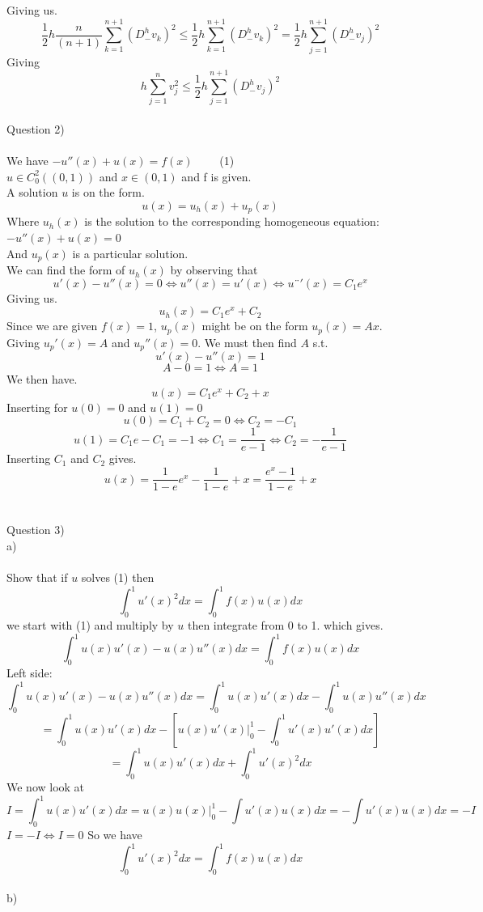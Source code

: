 \documentclass[12pt, letterpaper, twoside]{article}
\begin{document}
Giving us.
$$
\frac{1}{2} h \frac{n}{(n+1)} \sum_{k=1}^{n+1} (D_-^h v_k)^2 
\leq
\frac{1}{2} h  \sum_{k=1}^{n+1} (D_-^h v_k)^2 
=
\frac{1}{2} h  \sum_{j=1}^{n+1} (D_-^h v_j)^2 
$$
Giving
$$
h\sum_{j=1}^n v_j^2 \leq \frac{1}{2} h \sum_{j=1}^{n+1} (D_-^h v_j)^2
$$
\ \\
\newpage
Question 2)\\
\ \\
We have $-u''(x) + u(x) = f(x)$ \ \ \ \ (1) \\
$u \in C_0^2((0,1))$ and $x \in (0,1)$ and f is given.
\ \\
A solution $u$ is on the form.
$$
u(x) = u_h(x) + u_p(x) 
$$
Where $u_h(x)$ is the solution to the corresponding homogeneous equation:
$-u''(x) + u(x) = 0$\\
And $u_p(x)$ is a particular solution.\\
We can find the form of $u_h(x)$ by observing that
$$
u'(x) - u''(x) = 0 \iff u''(x) = u'(x) \iff u¨'(x) = C_1 e^x 
$$
Giving us.
$$
u_h(x) = C_1e^x + C_2
$$
Since we are given $f(x)=1$, $u_p(x)$ might be on the form $u_p(x) = Ax$.\\
Giving $u_p'(x) = A$ and $u_p''(x) = 0$. We must then find $A$ s.t.
$$
u'(x) - u''(x) = 1
$$
$$
A - 0 = 1 \iff A=1
$$
We then have.
$$
u(x) = C_1e^x + C_2 + x 
$$
Inserting for $u(0)= 0$ and $u(1)=0$
$$
u(0) = C_1 + C_2 = 0 \iff C_2 = -C_1
$$
$$
u(1) = C_1e - C_1 = -1 \iff C_1 = \frac{1}{e-1} \iff C_2 = -\frac{1}{e-1}
$$
Inserting $C_1$ and $C_2$ gives.
$$
u(x) = \frac{1}{1-e}e^x - \frac{1}{1-e} + x 
=
\frac{e^x - 1}{1 - e} + x
$$
\ \\
\newpage
\ \\
Question 3)\\
a)\\
\ \\
Show that if $u$ solves (1) then
$$
\int_0^1 u'(x)^2 dx = \int_0^1 f(x)u(x) dx
$$
we start with (1) and multiply by $u$ then integrate from 0 to 1. which gives.
$$
\int_0^1 u(x)u'(x) - u(x)u''(x) dx = \int_0^1 f(x)u(x) dx
$$
Left side:
$$
\int_0^1 u(x)u'(x) - u(x)u''(x) dx
=
\int_0^1 u(x)u'(x) dx - \int_0^1 u(x)u''(x) dx
$$
$$
=
\int_0^1 u(x)u'(x) dx - \left[ u(x)u'(x)|_0^1 - \int_0^1 u'(x)u'(x) dx \right]
$$
$$
=
\int_0^1 u(x)u'(x) dx + \int_0^1 u'(x)^2 dx 
$$
We now look at
$$
I = \int_0^1 u(x)u'(x) dx = u(x)u(x)|_0^1 - \int u'(x)u(x) dx = - \int u'(x)u(x) dx = -I
$$
$I = -I \iff I = 0$
So we have
$$
\int_0^1 u'(x)^2 dx = \int_0^1 f(x)u(x) dx
$$
\newpage
\ \\
b)\\
\ \\
\end{document}
